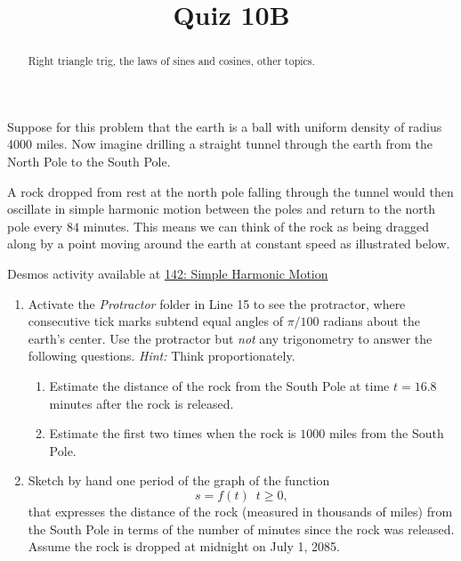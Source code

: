 \documentclass{ximera}
\title{Quiz 10B}
\begin{document}
\begin{abstract}
Right triangle trig, the laws of sines and cosines, other topics.
\end{abstract}
\maketitle



\begin{question}  \label{QKLKLddfgkghg}
Suppose for this problem that the earth is a ball with uniform density of radius 4000 miles. Now imagine drilling a straight tunnel through the earth from the North Pole to the South Pole. 

A rock dropped from rest at the north pole falling through the tunnel would then oscillate in simple harmonic motion between the poles and return to the north pole every $84$ minutes. This means we can think of the rock as being dragged along by a point moving around the earth at constant speed as illustrated below. 

\begin{onlineOnly}
    \begin{center}
\end{center}
\end{onlineOnly}

Desmos activity available at \href{https://www.desmos.com/calculator/ij8dqowgza}{142: Simple Harmonic Motion}

\begin{enumerate}

\item Activate the \emph{Protractor} folder in Line 15 to see the protractor, where consecutive tick marks subtend equal angles of $\pi/100$ radians about the earth's center. Use the protractor but \emph{not} any trigonometry to answer the following questions. \emph{Hint:} Think proportionately.

\begin{enumerate}
\item Estimate the distance of the rock from the South Pole at time $t=16.8$ minutes after the rock is released.

\item Estimate the first two times when the rock is $1000$ miles from the South Pole.
\end{enumerate} 

\item Sketch by hand one period of the graph of the function
\[
 s = f(t) \, \, \, t\geq 0 ,
\]
that expresses the distance of the rock (measured in thousands of miles) from the South Pole in terms of the number of minutes since the rock was released. Assume the rock is dropped at midnight on July 1, 2085.


\end{enumerate}
\end{question}
\end{document}
